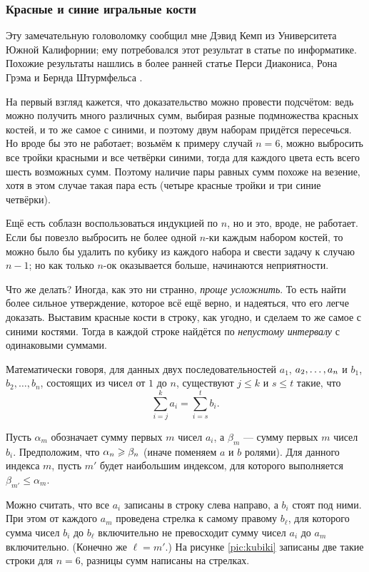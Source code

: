 \subsubsection*{Красные и синие игральные кости}

Эту замечательную головоломку сообщил мне Дэвид Кемп из Университета Южной Калифорнии; ему потребовался этот результат в статье по информатике.
Похожие результаты нашлись в более ранней статье 
Перси Диакониса, Рона Грэма и Бернда Штурмфельса \cite{14}.

На первый взгляд кажется, что доказательство можно провести  подсчётом: ведь можно получить много различных сумм, выбирая разные подмножества красных костей, и то же самое с синими, и поэтому двум наборам придётся пересечься.
Но вроде бы это не работает;
возьмём к примеру случай $n = 6$,  можно выбросить все тройки красными и все четвёрки синими, тогда для каждого цвета есть всего шесть возможных сумм.
Поэтому наличие пары равных сумм похоже на везение,
хотя в этом случае такая пара есть (четыре красные тройки и три синие четвёрки).

Ещё есть соблазн воспользоваться индукцией по $n$, но и это, вроде, не работает.
Если бы повезло выбросить не более одной $n$-ки каждым набором костей,
то можно было бы удалить по кубику из каждого набора и свести задачу к случаю $n-1$;
но как только $n$-ок оказывается больше, начинаются неприятности.

Что же делать?
Иногда, как это ни странно, \emph{проще усложнить}.
То есть найти более сильное утверждение, которое всё ещё верно, и надеяться, что его легче доказать.
Выставим красные кости в строку, как угодно, и сделаем то же самое с синими костями.
Тогда в каждой строке найдётся по \emph{непустому интервалу} с одинаковыми суммами.

Математически говоря, для данных двух последовательностей  $a_1$, $a_2,\z\dots,a_n$ и $b_1$, $b_2,\dots,b_n$, состоящих из чисел от $1$ до $n$, существуют 
$j\le k$ и 
$s\le t$ такие, что 
\[\sum_{i=j}^ka_i=\sum_{i=s}^tb_i.\]

Пусть $\alpha_m$ обозначает сумму первых $m$ чисел $a_i$,
а $\beta_m$ --- сумму первых $m$ чисел $b_i$.
Предположим, что $\alpha_n\z\ge \beta_n$ (иначе поменяем $a$ и $b$ ролями).
Для данного индекса $m$, пусть $m'$ будет наибольшим индексом, для которого выполняется $\beta_{m'}\le \alpha_m$.

Можно считать, что все $a_i$ записаны в строку слева направо, а $b_i$ стоят под ними.
При этом от каждого $a_m$ проведена стрелка к самому правому $b_\ell$, для которого сумма чисел $b_i$ до $b_\ell$ включительно не превосходит сумму чисел $a_i$ до $a_m$ включительно.
(Конечно же $\ell=m'$.)
На рисунке \ref{pic:kubiki} записаны две такие строки для $n=6$,
разницы сумм написаны на стрелках.


